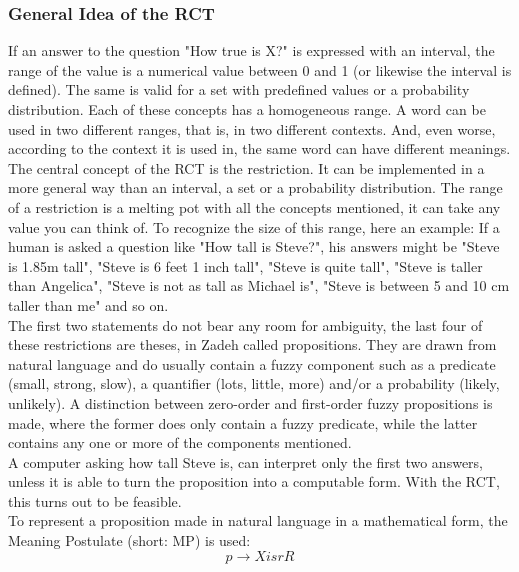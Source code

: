 \documentclass[conference]{IEEEtran}
\begin{document}
\subsubsection{General Idea of the RCT}
If an answer to the question "How true is X?" is expressed with an interval, the range of the value is a numerical value between 0 and 1 (or likewise the interval is defined). The same is valid for a set with predefined values or a probability distribution. Each of these concepts has a homogeneous range. A word can be used in two different ranges, that is, in two different contexts. And, even worse, according to the context it is used in, the same word can have different meanings.\\
The central concept of the RCT is the restriction. It can be implemented in a more general way than an interval, a set or a probability distribution. The range of a restriction is a melting pot with all the concepts mentioned, it can take any value you can think of. To recognize the size of this range, here an example: If a human is asked a question like "How tall is Steve?", his answers might be "Steve is 1.85m tall", "Steve is 6 feet 1 inch tall", "Steve is quite tall", "Steve is taller than Angelica", "Steve is not as tall as Michael is", "Steve is between 5 and 10 cm taller than me" and so on.\\
The first two statements do not bear any room for ambiguity, the last four of these restrictions are theses, in Zadeh \cite{zadeh2013} called propositions. They are drawn from natural language and do usually contain a fuzzy component such as a predicate (small, strong, slow), a quantifier (lots, little, more) and/or a probability (likely, unlikely). A distinction between zero-order and first-order fuzzy propositions is made, where the former does only contain a fuzzy predicate, while the latter contains any one or more of the components mentioned.\\
A computer asking how tall Steve is, can interpret only the first two answers, unless it is able to turn the proposition into a computable form. With the RCT, this turns out to be feasible.\\
To represent a proposition made in natural language in a mathematical form, the Meaning Postulate (short: MP) is used:
\begin{equation} \label{eq:mp}
p \rightarrow X isr R
\end{equation}
\end{document}
